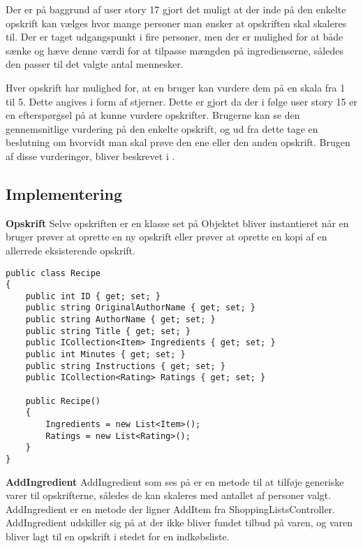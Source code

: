 Der er på baggrund af user story 17 gjort det muligt at der inde på den enkelte opskrift kan vælges hvor mange personer man ønsker at opskriften skal skaleres til.
Der er taget udgangspunkt i fire personer, men der er mulighed for at både sænke og hæve denne værdi for at tilpasse mængden på ingredienserne, således den passer til det valgte antal mennesker.


Hver opskrift har mulighed for, at en bruger kan vurdere dem på en skala fra 1 til 5.
Dette angives i form af stjerner.
Dette er gjort da der i følge user story 15 er en efterspørgsel på at kunne vurdere opskrifter.
Brugerne kan se den gennemsnitlige vurdering på den enkelte opskrift, og ud fra dette tage en beslutning om hvorvidt man skal prøve den ene eller den anden opskrift.
Brugen af disse vurderinger, bliver beskrevet i .


\subsection{Implementering}
\textbf{Opskrift}
Selve opskriften er en klasse set på  Objektet bliver instantieret når en bruger prøver at oprette en ny opskrift eller prøver at oprette en kopi af en allerrede eksisterende opskrift.


\begin{lstlisting}[caption="Klassen Recipe som svarer til objektet\, opskrift"]
public class Recipe
{
    public int ID { get; set; }
    public string OriginalAuthorName { get; set; }
    public string AuthorName { get; set; }
    public string Title { get; set; }
    public ICollection<Item> Ingredients { get; set; }
    public int Minutes { get; set; }
    public string Instructions { get; set; }
    public ICollection<Rating> Ratings { get; set; }

    public Recipe()
    {
        Ingredients = new List<Item>();
        Ratings = new List<Rating>();
    }
}
\end{lstlisting}

\textbf{AddIngredient}
AddIngredient som ses på er en metode til at tilføje generiske varer til opskrifterne, således de kan skaleres med antallet af personer valgt. AddIngredient er en metode der ligner AddItem fra ShoppingListsController. AddIngredient udskiller sig på at der ikke bliver fundet tilbud på varen, og varen bliver lagt til en opskrift i stedet for en indkøbsliste.


